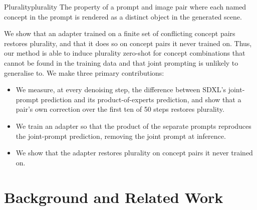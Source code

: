 \documentclass{article} %
\begin{document}
\begin{definitionbox}{Plurality}{plurality}
The property of a prompt and image pair where each named concept in the prompt is rendered as a distinct object in the generated scene.
\end{definitionbox}
We show that an adapter trained on a finite set of conflicting concept pairs restores plurality, and that it does so on concept pairs it never trained on. Thus, our method is able to induce plurality zero-shot for concept combinations that cannot be found in the training data and that joint prompting is unlikely to generalise to. We make three primary contributions:
\begin{itemize}
    \item We measure, at every denoising step, the difference between SDXL's joint-prompt prediction and its product-of-experts prediction, and show that a pair's own correction over the first ten of 50 steps restores plurality.
    \item We train an adapter so that the product of the separate prompts reproduces the joint-prompt prediction, removing the joint prompt at inference.
    \item We show that the adapter restores plurality on concept pairs it never trained on.
\end{itemize}

\section{Background and Related Work}
\label{sec:background}


\end{document}
